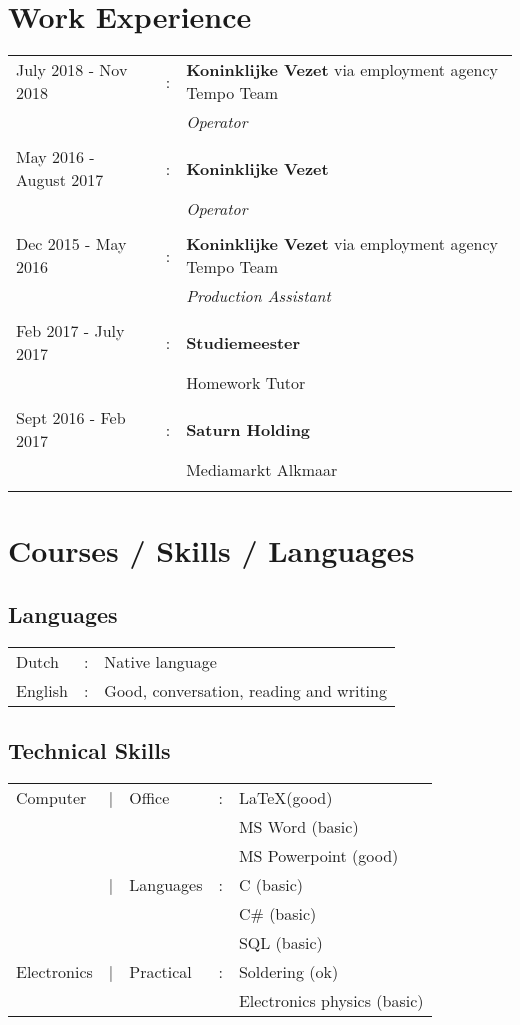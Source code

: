 \documentclass[11pt]{article}
\begin{document}
	\section*{Work Experience}
		\begin{table}[H]
			\begin{tabular}{l c l}
			July 2018 - Nov 2018 	&:&  \textbf{Koninklijke Vezet} \small via employment agency Tempo Team \\
			&& \textit{Operator}\\
			&&\\
			May 2016 - August 2017 &: & \textbf{Koninklijke Vezet} \\
			&&\textit{Operator}\\
			&&\\
			Dec 2015 - May 2016 &: &\textbf{Koninklijke Vezet} \small via employment agency Tempo Team \\	
			&&\textit{Production Assistant}\\
			&&\\
			Feb 2017 - July 2017 &:&\textbf{Studiemeester}\\
			&& Homework Tutor \\
			&&\\
			Sept 2016 - Feb 2017&:&\textbf{Saturn Holding}\\
			&& Mediamarkt Alkmaar \\
			&&\\
			
			
			\end{tabular}
		\end{table}
	
	
	\section*{Courses / Skills / Languages}
	\subsection*{Languages}
		\begin{tabular}{l c l}
	Dutch	&:& Native language\\
	English &:& Good, conversation, reading and writing\\	
		\end{tabular}

	
	\subsection*{Technical Skills}
	    \begin{tabular}{l c l c l}
	    Computer & | & Office &: & \LaTeX (good)\\
	    &&&&MS Word (basic)\\
	    &&&&MS Powerpoint (good)\\
	    &|&Languages&:& C (basic)\\
	    &&&&C\# (basic)\\
	    &&&&SQL (basic)\\
	    Electronics & | & Practical & : & Soldering (ok)\\
	    &&&& Electronics physics (basic) \\	
		\end{tabular}
	
\end{document}
